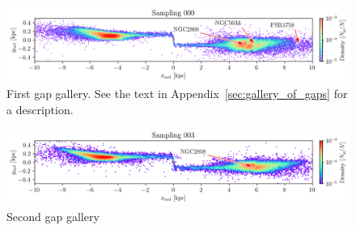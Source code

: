 \documentclass{aa}
\begin{document}
\begin{appendix}
    \begin{figure}
      \centering
      \includegraphics[width=\linewidth]{gallery_of_gaps_monte-carlo-000.png}
      \caption{First gap gallery. See the text in Appendix~\ref{sec:gallery_of_gaps} for a description.}
      \label{fig:gallery0}
      \end{figure}    


    \begin{figure}
      \centering
      \includegraphics[width=\linewidth]{gallery_of_gaps_monte-carlo-003.png}      
      \caption{Second gap gallery}
      \label{fig:gallery1}
      \end{figure}        






\end{appendix}
\end{document}
